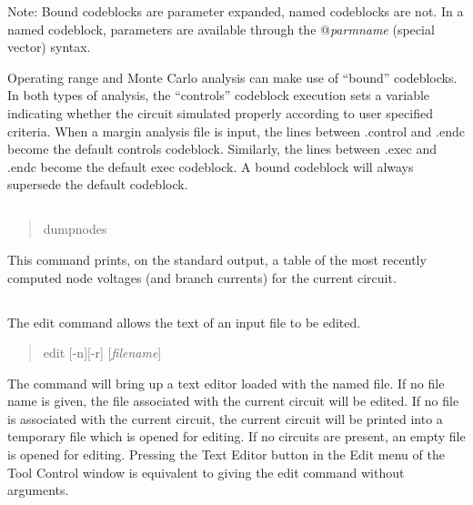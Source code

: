 Note:  Bound codeblocks are parameter expanded, named codeblocks
are not.  In a named codeblock, parameters are available through
the {\vt @}{\it parmname} (special vector) syntax.

Operating range and Monte Carlo analysis can make use of ``bound''
codeblocks.  In both types of analysis, the ``controls'' codeblock
execution sets a variable indicating whether the circuit simulated
properly according to user specified criteria.  When a margin analysis
file is input, the lines between {\vt .control} and {\vt .endc} become
the default controls codeblock.  Similarly, the lines between {\vt
.exec} and {\vt .endc} become the default exec codeblock.  A bound
codeblock will always supersede the default codeblock.

\subsection{}


\begin{quote}\vt
dumpnodes
\end{quote}

This command prints, on the standard output, a table of the most
recently computed node voltages (and branch currents) for the current
circuit.

\subsection{}


The {\cb edit} command allows the text of an input file to be edited.
\begin{quote}\vt
edit [-n][-r] [{\it filename\/}]
\end{quote}
The command will bring up a text editor loaded with the named file. 
If no file name is given, the file associated with the current circuit
will be edited.  If no file is associated with the current circuit,
the current circuit will be printed into a temporary file which is
opened for editing.  If no circuits are present, an empty file is
opened for editing.  Pressing the {\cb Text Editor} button in the {\cb
Edit} menu of the {\cb Tool Control} window is equivalent to giving
the {\cb edit} command without arguments.

